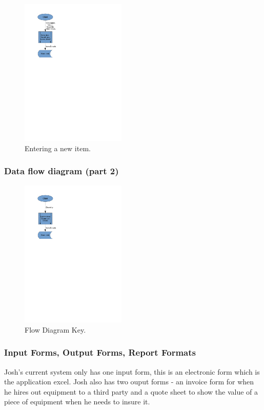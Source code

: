 \documentclass[a4paper,12pt]{report}
\begin{document}
\begin{figure}[H]
    \caption{Entering a new item.} \label{fig:print_function_result}
    \includegraphics[width=50mm,scale=0.5]{./Dataflow/DFD_analysis_new_item.pdf}
\end{figure}

\newpage

\subsubsection{Data flow diagram (part 2)}

\begin{figure}[H]
    \caption{Flow Diagram Key.} \label{fig:print_function_result}
    \includegraphics[width=50mm,scale=0.5]{./Dataflow/DFD_analysis_update_item.pdf}
\end{figure}

\newpage

\subsubsection{Input Forms, Output Forms, Report Formats}

Josh's current system only has one input form, this is an electronic form which is the application excel. Josh also has two ouput forms - an invoice form for when he hires out equipment to a third party and a quote sheet to show the value of a piece of equipment when he needs to insure it.
\end{document}
